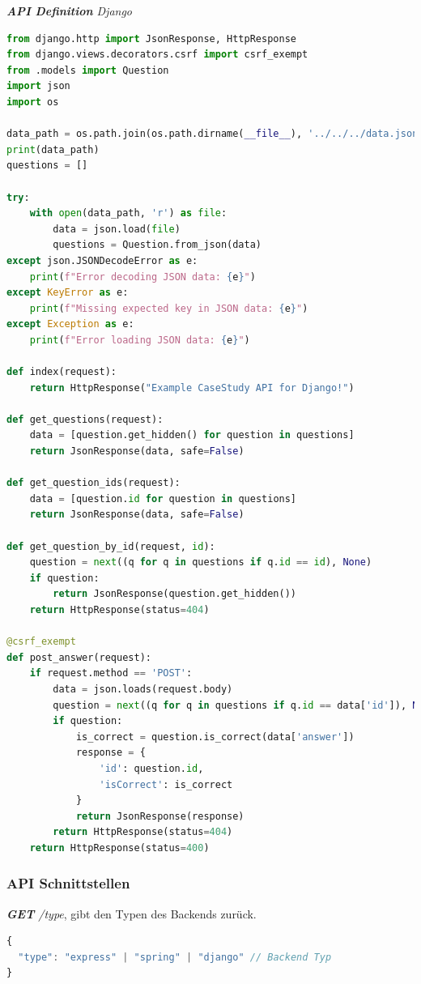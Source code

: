 \documentclass[biblatex]{lni}
\begin{document}
\textit{\textbf{API Definition} Django} \\
\begin{lstlisting}[caption={views.py}, label=api-dj, language=python]
from django.http import JsonResponse, HttpResponse
from django.views.decorators.csrf import csrf_exempt
from .models import Question
import json
import os

data_path = os.path.join(os.path.dirname(__file__), '../../../data.json')
print(data_path)
questions = []

try:
    with open(data_path, 'r') as file:
        data = json.load(file)
        questions = Question.from_json(data)
except json.JSONDecodeError as e:
    print(f"Error decoding JSON data: {e}")
except KeyError as e:
    print(f"Missing expected key in JSON data: {e}")
except Exception as e:
    print(f"Error loading JSON data: {e}")

def index(request):
    return HttpResponse("Example CaseStudy API for Django!")

def get_questions(request):
    data = [question.get_hidden() for question in questions]
    return JsonResponse(data, safe=False)

def get_question_ids(request):
    data = [question.id for question in questions]
    return JsonResponse(data, safe=False)

def get_question_by_id(request, id):
    question = next((q for q in questions if q.id == id), None)
    if question:
        return JsonResponse(question.get_hidden())
    return HttpResponse(status=404)

@csrf_exempt
def post_answer(request):
    if request.method == 'POST':
        data = json.loads(request.body)
        question = next((q for q in questions if q.id == data['id']), None)
        if question:
            is_correct = question.is_correct(data['answer'])
            response = {
                'id': question.id,
                'isCorrect': is_correct
            }
            return JsonResponse(response)
        return HttpResponse(status=404)
    return HttpResponse(status=400)

\end{lstlisting}

\subsubsection{API Schnittstellen}

\textit{\textbf{GET} /type}, gibt den Typen des Backends zurück. \\
\begin{lstlisting}[caption={\ac{JSON} der Route \textbf{GET} /question/ids }, label=get-ids, language=typescript]
{
  "type": "express" | "spring" | "django" // Backend Typ
}
\end{lstlisting}
\end{document}
